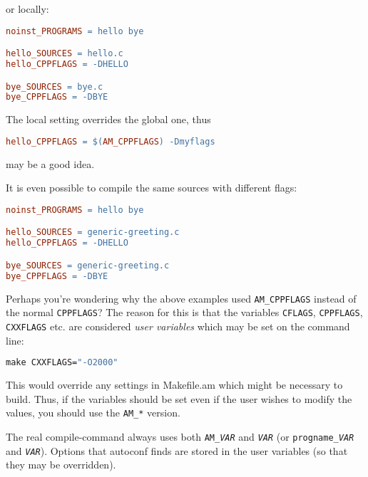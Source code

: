 \documentclass[11pt,a4paper,headinclude,footinclude,DIV16,normalheadings]{scrartcl}
\begin{document}
or locally:

\begin{lstlisting}[language=make]
noinst_PROGRAMS = hello bye

hello_SOURCES = hello.c
hello_CPPFLAGS = -DHELLO

bye_SOURCES = bye.c
bye_CPPFLAGS = -DBYE
\end{lstlisting}

The local setting overrides the global one, thus

\begin{lstlisting}[language=make]
hello_CPPFLAGS = $(AM_CPPFLAGS) -Dmyflags
\end{lstlisting}

may be a good idea.

It is even possible to compile the same sources with different flags:

\begin{lstlisting}[language=make]
noinst_PROGRAMS = hello bye

hello_SOURCES = generic-greeting.c
hello_CPPFLAGS = -DHELLO

bye_SOURCES = generic-greeting.c
bye_CPPFLAGS = -DBYE
\end{lstlisting}

Perhaps you're wondering why the above examples used
\texttt{AM\_CPPFLAGS} instead of the normal \texttt{CPPFLAGS}? The
reason for this is that the variables \texttt{CFLAGS},
\texttt{CPPFLAGS}, \texttt{CXXFLAGS} etc. are considered {\em user
  variables} which may be set on the command line:

\begin{lstlisting}[language=make]
make CXXFLAGS="-O2000"
\end{lstlisting}

This would override any settings in Makefile.am which might be
necessary to build. Thus, if the variables should be set even if the
user wishes to modify the values, you should use the \texttt{AM\_*}
version. 

The real compile-command always uses both \texttt{AM\_\textit{VAR}} and
\texttt{\textit{VAR}} (or \texttt{\texttt{progname}\_\textit{VAR}} and
\texttt{\textit{VAR}}).  Options that
autoconf finds are stored in the user variables (so that they may be
overridden).
\end{document}
